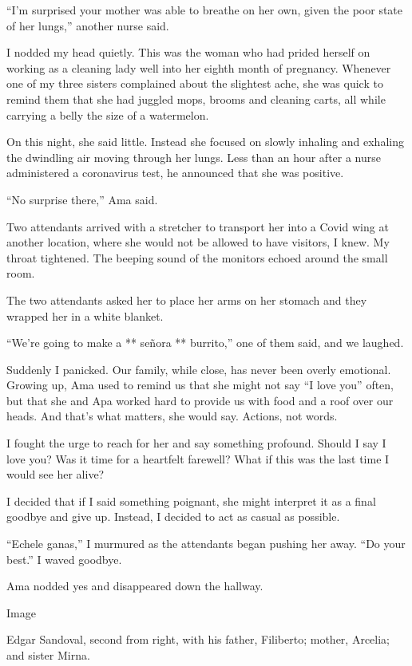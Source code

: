 ``I'm surprised your mother was able to breathe on her own, given the
poor state of her lungs,'' another nurse said.

I nodded my head quietly. This was the woman who had prided herself on
working as a cleaning lady well into her eighth month of pregnancy.
Whenever one of my three sisters complained about the slightest ache,
she was quick to remind them that she had juggled mops, brooms and
cleaning carts, all while carrying a belly the size of a watermelon.

On this night, she said little. Instead she focused on slowly inhaling
and exhaling the dwindling air moving through her lungs. Less than an
hour after a nurse administered a coronavirus test, he announced that
she was positive.

``No surprise there,'' Ama said.

Two attendants arrived with a stretcher to transport her into a Covid
wing at another location, where she would not be allowed to have
visitors, I knew. My throat tightened. The beeping sound of the monitors
echoed around the small room.

The two attendants asked her to place her arms on her stomach and they
wrapped her in a white blanket.

``We're going to make a ** señora ** burrito,'' one of them said, and we
laughed.

Suddenly I panicked. Our family, while close, has never been overly
emotional. Growing up, Ama used to remind us that she might not say ``I
love you'' often, but that she and Apa worked hard to provide us with
food and a roof over our heads. And that's what matters, she would say.
Actions, not words.

I fought the urge to reach for her and say something profound. Should I
say I love you? Was it time for a heartfelt farewell? What if this was
the last time I would see her alive?

I decided that if I said something poignant, she might interpret it as a
final goodbye and give up. Instead, I decided to act as casual as
possible.

``Echele ganas,'' I murmured as the attendants began pushing her away.
``Do your best.'' I waved goodbye.

Ama nodded yes and disappeared down the hallway.

Image

Edgar Sandoval, second from right, with his father, Filiberto; mother,
Arcelia; and sister Mirna.


